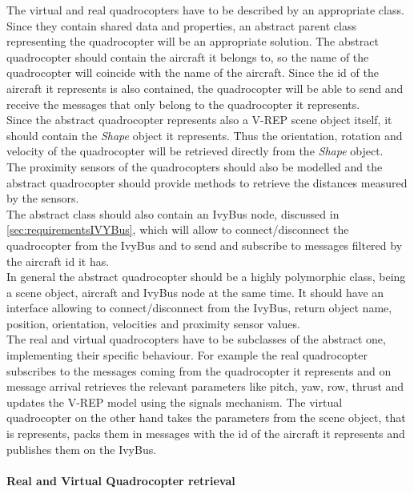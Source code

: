 The virtual and real quadrocopters have to be described by an appropriate class. \\
Since they contain shared data and properties, an abstract parent class representing the quadrocopter will be an appropriate solution. The abstract quadrocopter should contain the aircraft it belongs to, so the name of the quadrocopter will coincide with the name of the aircraft. Since the id of the aircraft it represents is also contained, the quadrocopter will be able to send and receive the messages that only belong to the quadrocopter it represents. \\
Since the abstract quadrocopter represents also a V-REP scene object itself, it should contain the \textit{Shape} object it represents. Thus the orientation, rotation and velocity of the quadrocopter will be retrieved directly from the \textit{Shape} object.\\
The proximity sensors of the quadrocopters should also be modelled and the abstract quadrocopter should provide methods to retrieve the distances measured by the sensors.\\
The abstract class should also contain an IvyBus node, discussed in \ref{sec:requirementsIVYBus}, which will allow to connect/disconnect the quadrocopter from the IvyBus and to send and subscribe to messages filtered by the aircraft id it has. \\
In general the abstract quadrocopter should be a highly polymorphic class, being a scene object, aircraft and IvyBus node at the same time. It should have an interface allowing to connect/disconnect from the IvyBus, return object name, position, orientation, velocities and proximity sensor values. \\
The real and virtual quadrocopters have to be subclasses of the abstract one, implementing their specific behaviour. For example the real quadrocopter subscribes to the messages coming from the quadrocopter it represents and on message arrival retrieves the relevant parameters like pitch, yaw, row, thrust and updates the V-REP model using the signals mechanism. The virtual quadrocopter on the other hand takes the parameters from the scene object, that is represents, packs them in messages with the id of the aircraft it represents and publishes them on the IvyBus.

\paragraph{Real and Virtual Quadrocopter retrieval}

